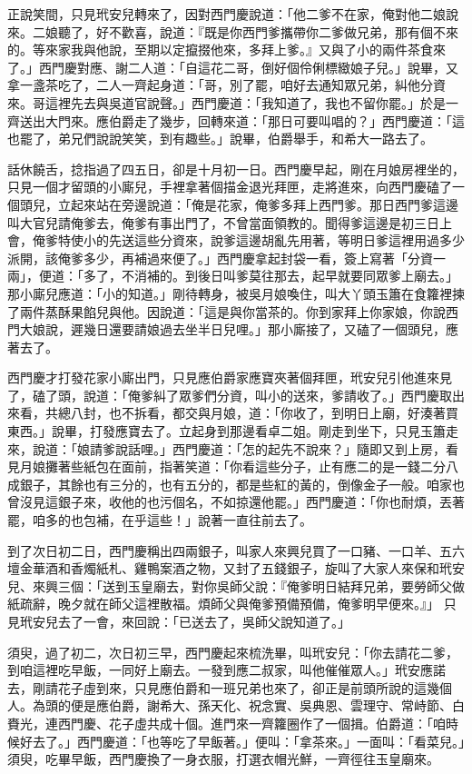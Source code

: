 \begin{showcontents}{}
正說笑間，只見玳安兒轉來了，因對西門慶說道：「他二爹不在家，俺對他二娘說來。二娘聽了，好不歡喜，說道：『既是你西門爹攜帶你二爹做兄弟，那有個不來的。等來家我與他說，至期以定攛掇他來，多拜上爹。』又與了小的兩件茶食來了。」西門慶對應、謝二人道：「自這花二哥，倒好個伶俐標緻娘子兒。」說畢，又拿一盞茶吃了，二人一齊起身道：「哥，別了罷，咱好去通知眾兄弟，糾他分資來。哥這裡先去與吳道官說聲。」西門慶道：「我知道了，我也不留你罷。」於是一齊送出大門來。應伯爵走了幾步，回轉來道：「那日可要叫唱的？」西門慶道：「這也罷了，弟兄們說說笑笑，到有趣些。」說畢，伯爵舉手，和希大一路去了。

話休饒舌，捻指過了四五日，卻是十月初一日。西門慶早起，剛在月娘房裡坐的，只見一個才留頭的小廝兒，手裡拿著個描金退光拜匣，走將進來，向西門慶磕了一個頭兒，立起來站在旁邊說道：「俺是花家，俺爹多拜上西門爹。那日西門爹這邊叫大官兒請俺爹去，俺爹有事出門了，不曾當面領教的。聞得爹這邊是初三日上會，俺爹特使小的先送這些分資來，說爹這邊胡亂先用著，等明日爹這裡用過多少派開，該俺爹多少，再補過來便了。」西門慶拿起封袋一看，簽上寫著「分資一兩」，便道：「多了，不消補的。到後日叫爹莫往那去，起早就要同眾爹上廟去。」那小廝兒應道：「小的知道。」剛待轉身，被吳月娘喚住，叫大丫頭玉簫在食籮裡揀了兩件蒸酥果餡兒與他。因說道：「這是與你當茶的。你到家拜上你家娘，你說西門大娘說，遲幾日還要請娘過去坐半日兒哩。」那小廝接了，又磕了一個頭兒，應著去了。

西門慶才打發花家小廝出門，只見應伯爵家應寶夾著個拜匣，玳安兒引他進來見了，磕了頭，說道：「俺爹糾了眾爹們分資，叫小的送來，爹請收了。」西門慶取出來看，共總八封，也不拆看，都交與月娘，道：「你收了，到明日上廟，好湊著買東西。」說畢，打發應寶去了。立起身到那邊看卓二姐。剛走到坐下，只見玉簫走來，說道：「娘請爹說話哩。」西門慶道：「怎的起先不說來？」隨即又到上房，看見月娘攤著些紙包在面前，指著笑道：「你看這些分子，止有應二的是一錢二分八成銀子，其餘也有三分的，也有五分的，都是些紅的黃的，倒像金子一般。咱家也曾沒見這銀子來，收他的也污個名，不如掠還他罷。」西門慶道：「你也耐煩，丟著罷，咱多的也包補，在乎這些！」說著一直往前去了。

到了次日初二日，西門慶稱出四兩銀子，叫家人來興兒買了一口豬、一口羊、五六壇金華酒和香燭紙札、雞鴨案酒之物，又封了五錢銀子，旋叫了大家人來保和玳安兒、來興三個：「送到玉皇廟去，對你吳師父說：『俺爹明日結拜兄弟，要勞師父做紙疏辭，晚夕就在師父這裡散福。煩師父與俺爹預備預備，俺爹明早便來。』」 只見玳安兒去了一會，來回說：「已送去了，吳師父說知道了。」

須臾，過了初二，次日初三早，西門慶起來梳洗畢，叫玳安兒：「你去請花二爹，到咱這裡吃早飯，一同好上廟去。一發到應二叔家，叫他催催眾人。」玳安應諾去，剛請花子虛到來，只見應伯爵和一班兄弟也來了，卻正是前頭所說的這幾個人。為頭的便是應伯爵，謝希大、孫天化、祝念實、吳典恩、雲理守、常峙節、白賚光，連西門慶、花子虛共成十個。進門來一齊籮圈作了一個揖。伯爵道：「咱時候好去了。」西門慶道：「也等吃了早飯著。」便叫：「拿茶來。」一面叫：「看菜兒。」須臾，吃畢早飯，西門慶換了一身衣服，打選衣帽光鮮，一齊徑往玉皇廟來。


\end{showcontents}

